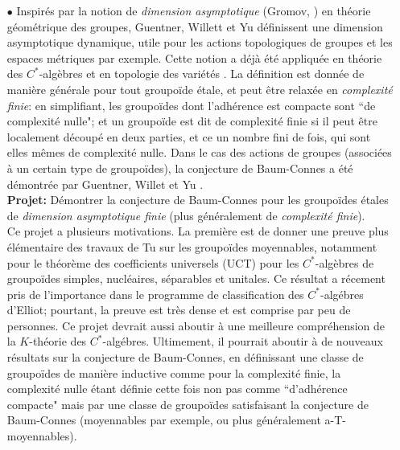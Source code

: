 \documentclass[a4paper,11pt]{article}
\begin{document}
\begin{itemize} 
\item[$\bullet$] Inspir\'es par la notion de \textit{dimension asymptotique} (Gromov, \cite{gromov1993asymptotic}) en th\'eorie g\'eom\'etrique des groupes, Guentner,  Willett et Yu d\'efinissent \cite{GWY} une dimension asymptotique dynamique, utile pour les actions topologiques de groupes et les espaces m\'etriques par exemple. Cette notion a d\'ej\`a \'et\'e appliqu\'ee en th\'eorie des $C^*$-alg\`ebres \cite{deeley2018nuclear} et en topologie des vari\'et\'es \cite{bartels2019farrell}. La d\'efinition est donn\'ee de mani\`ere g\'en\'erale pour tout groupo\"ide \'etale, et peut \^etre relax\'ee en \textit{complexit\'e finie}: en simplifiant, les groupo\"ides dont l'adh\'erence est compacte sont ``de complexit\'e nulle"; et un groupo\"ide est dit de complexit\'e finie si il peut \^etre localement d\'ecoup\'e en deux parties, et ce un nombre fini de fois, qui sont elles m\^emes de complexit\'e nulle. Dans le cas des actions de groupes (associ\'ees \`a un certain type de groupo\"ides), la conjecture de Baum-Connes a \'et\'e d\'emontr\'ee par Guentner, Willet et Yu \cite{GWY2}.\\

\textbf{Projet:} D\'emontrer la conjecture de Baum-Connes pour les groupo\"ides \'etales de \textit{dimension asymptotique finie} (plus g\'en\'eralement de \textit{complexit\'e finie}).\\

Ce projet a plusieurs motivations. La premi\`ere est de donner une preuve plus \'el\'ementaire des travaux de Tu \cite{TuThese} sur les groupo\"ides moyennables, notamment pour le th\'eor\`eme des coefficients universels (UCT) pour les $C^*$-alg\`ebres de groupo\"ides simples, nucl\'eaires, s\'eparables et unitales. Ce r\'esultat a r\'ecement pris de l'importance dans le programme de classification des $C^*$-alg\'ebres d'Elliot; pourtant, la preuve est tr\`es dense et est comprise par peu de personnes. Ce projet devrait aussi aboutir \`a une meilleure compr\'ehension de la $K$-th\'eorie des $C^*$-alg\'ebres. Ultimement, il pourrait aboutir \`a de nouveaux r\'esultats sur la conjecture de Baum-Connes, en d\'efinissant une classe de groupo\"ides de mani\`ere inductive comme pour la complexit\'e finie, la complexit\'e nulle \'etant d\'efinie cette fois non pas comme ``d'adh\'erence compacte" mais par une classe de groupo\"ides satisfaisant la conjecture de Baum-Connes (moyennables par exemple, ou plus g\'en\'eralement a-T-moyennables).\\


\end{itemize}
\end{document}
